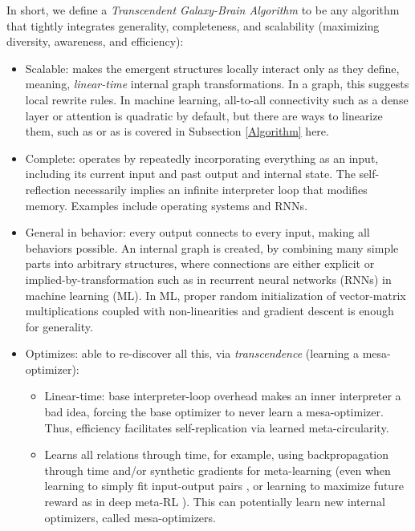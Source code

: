 \documentclass{article}
\begin{document}
In short, we define a \textit{Transcendent Galaxy-Brain Algorithm} to be any algorithm that tightly integrates generality, completeness, and scalability (maximizing diversity, awareness, and efficiency):

\begin{itemize}
\item Scalable: makes the emergent structures locally interact only as they define, meaning, \textit{linear-time} internal graph transformations. In a graph, this suggests local rewrite rules. In machine learning, all-to-all connectivity such as a dense layer or attention is quadratic by default, but there are ways to linearize them, such as \cite{schlag2021linear} \cite{tolstikhin2021mlpmixer} or as is covered in Subsection \ref{Algorithm} here.
\item Complete: operates by repeatedly incorporating everything as an input, including its current input and past output and internal state. The self-reflection necessarily implies an infinite interpreter loop that modifies memory. Examples include operating systems and RNNs.
\item General in behavior: every output connects to every input, making all behaviors possible. An internal graph is created, by combining many simple parts into arbitrary structures, where connections are either explicit or implied-by-transformation such as in recurrent neural networks (RNNs) in machine learning (ML). In ML, proper random initialization of vector-matrix multiplications coupled with non-linearities and gradient descent is enough for generality.
\item Optimizes: able to re-discover all this, via \textit{transcendence} (learning a mesa-optimizer):
\begin{itemize}
\item Linear-time: base interpreter-loop overhead makes an inner interpreter a bad idea, forcing the base optimizer to never learn a mesa-optimizer. Thus, efficiency facilitates self-replication via learned meta-circularity.
\item Learns all relations through time, for example, using backpropagation through time and/or synthetic gradients for meta-learning (even when learning to simply fit input-output pairs \cite{santoro2016oneshot}, or learning to maximize future reward as in deep meta-RL \cite{DBLP:journals/corr/WangKTSLMBKB16}). This can potentially learn new internal optimizers, called mesa-optimizers.

\end{itemize}
\end{itemize}
\end{document}
